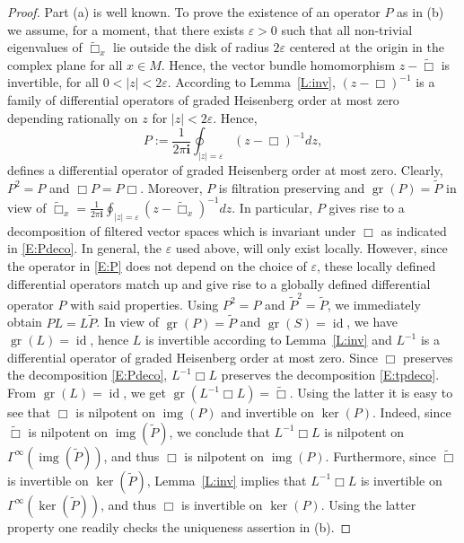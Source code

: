 \documentclass[reqno,12pt]{amsart}
\DeclareMathOperator{\img}{img}
\DeclareMathOperator{\gr}{gr}
\DeclareMathOperator{\id}{id}
\newcommand\ii{\mathbf i}
\theoremstyle{plain}
\theoremstyle{definition}
\begin{document}
\begin{proof}
Part (a) is well known.
To prove the existence of an operator $P$ as in (b) we assume, for a moment, that there exists $\varepsilon>0$ such that all non-trivial eigenvalues of $\tilde\Box_x$ lie outside the disk of radius $2\varepsilon$ centered at the origin in the complex plane for all $x\in M$.
Hence, the vector bundle homomorphism $z-\tilde\Box$ is invertible, for all $0<|z|<2\varepsilon$.
According to Lemma~\ref{L:inv}, $(z-\Box)^{-1}$ is a family of differential operators of graded Heisenberg order at most zero depending rationally on $z$ for $|z|<2\varepsilon$.
Hence,
\begin{equation}\label{E:P}
P:=\frac1{2\pi\ii}\oint_{|z|=\varepsilon}(z-\Box)^{-1}dz,
\end{equation}
defines a differential operator of graded Heisenberg order at most zero.
Clearly, $P^2=P$ and $\Box P=P\Box$.
Moreover, $P$ is filtration preserving and $\gr(P)=\tilde P$ in view of $\tilde\Box_x=\frac1{2\pi\mathbf i}\oint_{|z|=\varepsilon}(z-\tilde \Box_x)^{-1}dz$.
In particular, $P$ gives rise to a decomposition of filtered vector spaces which is invariant under $\Box$ as indicated in \eqref{E:Pdeco}.
In general, the $\varepsilon$ used above, will only exist locally.
However, since the operator in \eqref{E:P} does not depend on the choice of $\varepsilon$, these locally defined differential operators match up and give rise to a globally defined differential operator $P$ with said properties.
Using $P^2=P$ and $\tilde P^2=\tilde P$, we immediately obtain $PL=L\tilde P$.
In view of $\gr(P)=\tilde P$ and $\gr(S)=\id$, we have $\gr(L)=\id$, hence $L$ is invertible according to Lemma~\ref{L:inv} and $L^{-1}$ is a differential operator of graded Heisenberg order at most zero.
Since $\Box$ preserves the decomposition \eqref{E:Pdeco}, $L^{-1}\Box L$ preserves the decomposition \eqref{E:tpdeco}.
From $\gr(L)=\id$, we get $\gr(L^{-1}\Box L)=\tilde\Box$.
Using the latter it is easy to see that $\Box$ is nilpotent on $\img(P)$ and invertible on $\ker(P)$.
Indeed, since $\tilde\Box$ is nilpotent on $\img(\tilde P)$, we conclude that $L^{-1}\Box L$ is nilpotent on $\Gamma^\infty(\img(\tilde P))$, and thus $\Box$ is nilpotent on $\img(P)$.
Furthermore, since $\tilde\Box$ is invertible on $\ker(\tilde P)$, Lemma~\ref{L:inv} implies that $L^{-1}\Box L$ is invertible on $\Gamma^\infty(\ker(\tilde P))$, and thus $\Box$ is invertible on $\ker(P)$.
Using the latter property one readily checks the uniqueness assertion in (b).
\end{proof}
\end{document}
